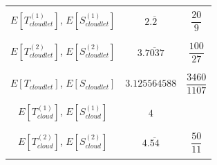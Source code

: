 \documentclass[10pt,a4paper]{article}
\begin{document}
\begin{table}[h!]
\begin{adjustbox}{center=\textwidth}
\begin{tabular}{c|c|c}
	 &&\\\hline &&\\
     
     $E[T^{(1)}_{cloudlet}]$, $E[S^{(1)}_{cloudlet}]$ & $2.\overline{2}$ & $\dfrac{20}{9}$  \\
     
     &&\\\hline &&\\
     
     $E[T^{(2)}_{cloudlet}]$, $E[S^{(2)}_{cloudlet}]$ & $3.\overline{7037}$ & $\dfrac{100}{27}$  \\
     
     &&\\\hline &&\\
     
     $E[T_{cloudlet}]$, $E[S_{cloudlet}]$ & $3.125564588$ & $\dfrac{3460}{1107}$  \\
     
     &&\\\hline &&\\
     
     $E[T^{(1)}_{cloud}]$, $E[S^{(1)}_{cloud}]$ & $4$ & \\
     
     &&\\\hline &&\\
     
     $E[T^{(2)}_{cloud}]$, $E[S^{(2)}_{cloud}]$ & $4.\overline{54}$ & $\dfrac{50}{11}$  \\
	
	 &&\\

     \bottomrule

    \end{tabular}
    \end{adjustbox}
\end{table}
\end{document}
